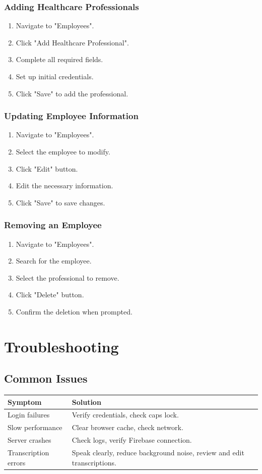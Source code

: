 \documentclass[12pt, titlepage]{article}
\begin{document}
\subsubsection{Adding Healthcare Professionals}
\begin{enumerate}
\item Navigate to "Employees".
\item Click "Add Healthcare Professional".
\item Complete all required fields.
\item Set up initial credentials.
\item Click "Save" to add the professional.
\end{enumerate}

\subsubsection{Updating Employee Information}
\begin{enumerate}
\item Navigate to "Employees".
\item Select the employee to modify.
\item Click "Edit" button.
\item Edit the necessary information.
\item Click "Save" to save changes.
\end{enumerate}

\subsubsection{Removing an Employee}
\begin{enumerate}
\item Navigate to "Employees".
\item Search for the employee.
\item Select the professional to remove.
\item Click "Delete" button.
\item Confirm the deletion when prompted.
\end{enumerate}


\section{Troubleshooting}
\subsection{Common Issues}
\begin{longtable}{p{}p{}}
\toprule
\textbf{Symptom} & \textbf{Solution} \\
\midrule
Login failures & Verify credentials, check caps lock. \\
Slow performance & Clear browser cache, check network. \\
Server crashes & Check logs, verify Firebase connection. \\
Transcription errors & Speak clearly, reduce background noise, review and edit transcriptions. \\
\bottomrule
\end{longtable}
\end{document}
